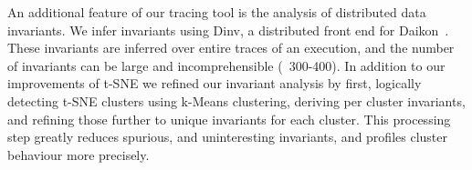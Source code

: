 An additional feature of our tracing tool is the analysis of
distributed data invariants. We infer invariants using Dinv, a
distributed front end for Daikon~\cite{Ernst99dynamicallydiscovering}.
These invariants are inferred over entire traces of an execution, and
the number of invariants can be large and incomprehensible (~300-400).
In addition to our improvements of t-SNE we refined our invariant
analysis by first, logically detecting t-SNE clusters using k-Means
clustering, deriving per cluster invariants, and refining those
further to unique invariants for each cluster. This processing step
greatly reduces spurious, and uninteresting invariants, and profiles
cluster behaviour more precisely.



